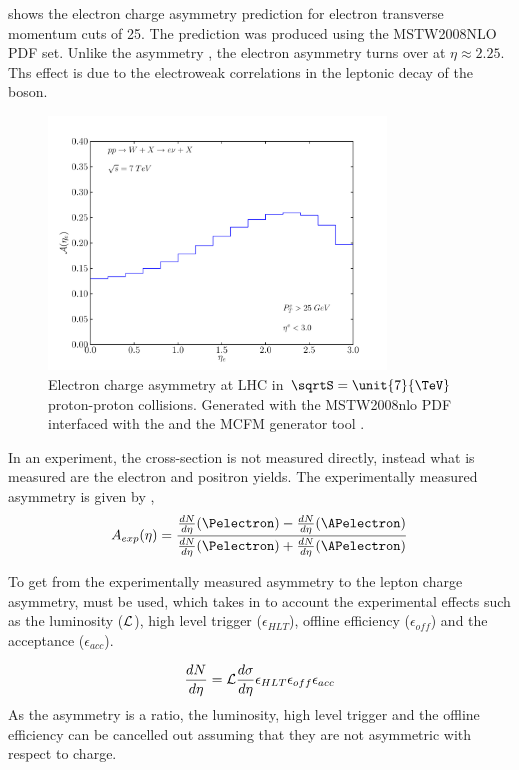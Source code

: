  shows the electron charge asymmetry prediction for
electron transverse momentum cuts of \unit{25}{\GeV}. The prediction was
produced using the MSTW2008NLO PDF\cite{mstw} set.
Unlike the \PW asymmetry , the electron asymmetry turns over at $\eta\approx
2.25$. Ths effect is due to the electroweak correlations in the leptonic decay of
the \PW boson.

\begin{figure}[htbp]
  \centering
  \includegraphics[width=0.8\textwidth]{lepton-asym}
  \caption{Electron charge asymmetry at LHC in $\sqrtS=\unit{7}{\TeV}$ proton-proton collisions. 
Generated with the MSTW2008nlo PDF\cite{martin2009parton} interfaced with the
and the MCFM generator tool \cite{campbellmcfm}.}
  \label{wbos:asym_simple}
\end{figure}

In an experiment, the cross-section is not measured directly, instead what is
measured are the electron and positron yields.  The experimentally measured
asymmetry is given by ,
\begin{equation}
A_{exp}(\eta)=\frac{  \frac{dN}{d\eta}(\Pelectron) -
\frac{dN}{d\eta}(\APelectron) }{ \frac{dN}{d\eta}(\Pelectron) +
\frac{dN}{d\eta}(\APelectron) }
\label{eq:AsymExp}
\end{equation} 

To get from the experimentally measured asymmetry to the lepton charge
asymmetry,  must be used, which takes in to
account the experimental effects such as the luminosity (${\cal L}$), high
level trigger ($\epsilon_{HLT}$), offline efficiency ($ \epsilon_{off}$) and
the acceptance ($\epsilon_{acc}$).

\begin{equation}
\frac{dN}{d\eta} = {\cal L } \frac{d\sigma}{d\eta}  \epsilon_{HLT}
\epsilon_{off} \epsilon_{acc}
\label{eq:NumEve}
\end{equation} 
As the asymmetry is a ratio, the luminosity, high level trigger and the
offline efficiency can be cancelled out assuming that they are not asymmetric
with respect to charge. 

